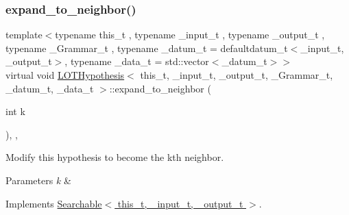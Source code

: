 \mbox{\label{class_l_o_t_hypothesis_a448c8ed494a4199c63e676b4a06b4af6}} 
\subsubsection{\texorpdfstring{expand\+\_\+to\+\_\+neighbor()}{expand\_to\_neighbor()}}
{\footnotesize\ttfamily template$<$typename this\+\_\+t , typename \+\_\+input\+\_\+t , typename \+\_\+output\+\_\+t , typename \+\_\+\+Grammar\+\_\+t , typename \+\_\+datum\+\_\+t  = defaultdatum\+\_\+t$<$\+\_\+input\+\_\+t, \+\_\+output\+\_\+t$>$, typename \+\_\+data\+\_\+t  = std\+::vector$<$\+\_\+datum\+\_\+t$>$$>$ \\
virtual void \hyperlink{class_l_o_t_hypothesis}{L\+O\+T\+Hypothesis}$<$ this\+\_\+t, \+\_\+input\+\_\+t, \+\_\+output\+\_\+t, \+\_\+\+Grammar\+\_\+t, \+\_\+datum\+\_\+t, \+\_\+data\+\_\+t $>$\+::expand\+\_\+to\+\_\+neighbor (\begin{DoxyParamCaption}\item[{int}]{k }\end{DoxyParamCaption})\hspace{0.3cm}{\ttfamily [inline]}, {\ttfamily [override]}, {\ttfamily [virtual]}}



Modify this hypothesis to become the k\textquotesingle{}th neighbor. 


\begin{DoxyParams}{Parameters}
{\em k} & \\
\hline
\end{DoxyParams}


Implements \hyperlink{class_searchable_a9088dba3920f4c66ce671aa16a7d29a4}{Searchable$<$ this\+\_\+t, \+\_\+input\+\_\+t, \+\_\+output\+\_\+t $>$}.

\mbox{\label{class_l_o_t_hypothesis_aa8501ac78dcf74e212104095f54ffe21}} 
